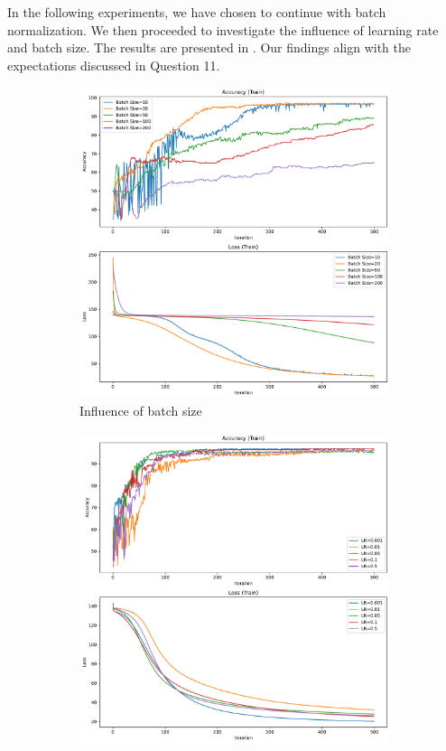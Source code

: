 In the following experiments, we have chosen to continue with batch normalization. We then proceeded to investigate the influence of learning rate and batch size. The results are presented in . Our findings align with the expectations discussed in Question 11.

\begin{figure}[H]
    \centering
    \begin{subfigure}{0.45\textwidth}
        \centering
        \includegraphics[width=\textwidth]{figs/NN/manual_batchsize.pdf}
        \caption{Influence of batch size}
        \label{subfig:manual_batchsize}
    \end{subfigure}
    \begin{subfigure}{0.45\textwidth}
        \centering
        \includegraphics[width=\textwidth]{figs/NN/manual_lr.pdf}

\end{subfigure}
\end{figure}
